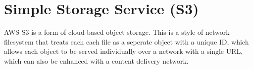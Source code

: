\chapter{Simple Storage Service (S3)}\label{ch:simple-storage-service}

AWS S3 is a form of cloud-based object storage.
This is a style of network filesystem that treats each each file as a seperate object with a unique ID, which allows each object to be served individually over a network with a single URL, which can also be enhanced with a content delivery network.